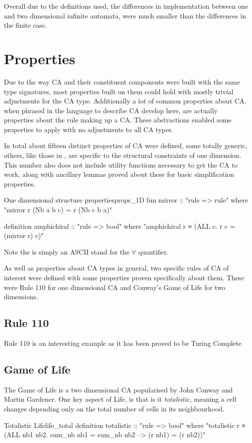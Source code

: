 Overall due to the definitions used,
the differences in implementation between one and two dimensional infinite automata,
were much smaller than the differences in the finite case.


\section{Properties}

Due to the way CA and their constituent components were built with the same type signatures,
most properties built on them could hold with mostly trivial adjustments for the CA type.
Additionally a lot of common properties about CA, 
when phrased in the language to describe CA develop here,
are actually properties about the rule making up a CA.
These abstractions enabled some properties to apply with no adjustments to all CA types.

In total about fifteen distinct properties of CA were defined,
some totally generic,
others,
like those in ,
are specific to the structural constraints of one dimension.
This number also does not include utility functions necessary to get the CA to work,
along with ancillary lemmas proved about these for basic simplification properties.

\begin{myminted}{One dimensional structure properties}{props_1D}
    fun mirror :: "rule => rule" where
    "mirror r (Nb a b c) = r (Nb c b a)"

    definition amphichiral :: "rule => bool" where
    "amphichiral r ≡ (ALL c. r c = (mirror r) c)"
\end{myminted}

Note the  is simply an ASCII stand for the $\forall$ quantifier.


As well as properties about CA types in general,
two specific rules of CA of interest were defined with some properties proven specifically about them.
These were Rule 110 for one dimensional CA and Conway's Game of Life for two dimensions.

\subsection{Rule 110}
Rule 110 is an interesting example as it has been proved to be Turing Complete

\subsection{Game of Life}
The Game of Life is a two dimensional CA popularised by John Conway and Martin Gardener.
One key aspect of Life,
is that is it \emph{totalistic},
meaning a cell changes depending only on the total number of  cells in its neighbourhood.


\begin{myminted}{Totalistic Life}{life_total}
    definition totalistic :: "rule => bool" where
    "totalistic r ≡ (ALL nb1 nb2. sum_nb nb1 = sum_nb nb2 --> (r nb1) = (r nb2))"
\end{myminted}

